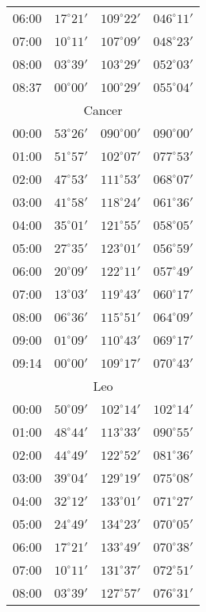 \begin{table}
\begin{Parallel}{}{}
{{\begin{tabular}{l|lll}
06:00 & $17^\circ 21'$ & $109^\circ 22'$& $046^\circ 11'$ \\
07:00 & $10^\circ 11'$ & $107^\circ 09'$& $048^\circ 23'$ \\
08:00 & $03^\circ 39'$ & $103^\circ 29'$& $052^\circ 03'$ \\
08:37 & $00^\circ 00'$ & $100^\circ 29'$& $055^\circ 04'$ \\
\multicolumn{4}{c}{Cancer}\\
00:00 & $53^\circ 26'$ & $090^\circ 00'$& $090^\circ 00'$ \\
01:00 & $51^\circ 57'$ & $102^\circ 07'$& $077^\circ 53'$ \\
02:00 & $47^\circ 53'$ & $111^\circ 53'$& $068^\circ 07'$ \\
03:00 & $41^\circ 58'$ & $118^\circ 24'$& $061^\circ 36'$ \\
04:00 & $35^\circ 01'$ & $121^\circ 55'$& $058^\circ 05'$ \\
05:00 & $27^\circ 35'$ & $123^\circ 01'$& $056^\circ 59'$ \\
06:00 & $20^\circ 09'$ & $122^\circ 11'$& $057^\circ 49'$ \\
07:00 & $13^\circ 03'$ & $119^\circ 43'$& $060^\circ 17'$ \\
08:00 & $06^\circ 36'$ & $115^\circ 51'$& $064^\circ 09'$ \\
09:00 & $01^\circ 09'$ & $110^\circ 43'$& $069^\circ 17'$ \\
09:14 & $00^\circ 00'$ & $109^\circ 17'$& $070^\circ 43'$ \\
\multicolumn{4}{c}{Leo}\\
00:00 & $50^\circ 09'$ & $102^\circ 14'$& $102^\circ 14'$ \\
01:00 & $48^\circ 44'$ & $113^\circ 33'$& $090^\circ 55'$ \\
02:00 & $44^\circ 49'$ & $122^\circ 52'$& $081^\circ 36'$ \\
03:00 & $39^\circ 04'$ & $129^\circ 19'$& $075^\circ 08'$ \\
04:00 & $32^\circ 12'$ & $133^\circ 01'$& $071^\circ 27'$ \\
05:00 & $24^\circ 49'$ & $134^\circ 23'$& $070^\circ 05'$ \\
06:00 & $17^\circ 21'$ & $133^\circ 49'$& $070^\circ 38'$ \\
07:00 & $10^\circ 11'$ & $131^\circ 37'$& $072^\circ 51'$ \\
08:00 & $03^\circ 39'$ & $127^\circ 57'$& $076^\circ 31'$ \\
\end{tabular}
}}
\end{Parallel}
\end{table}
